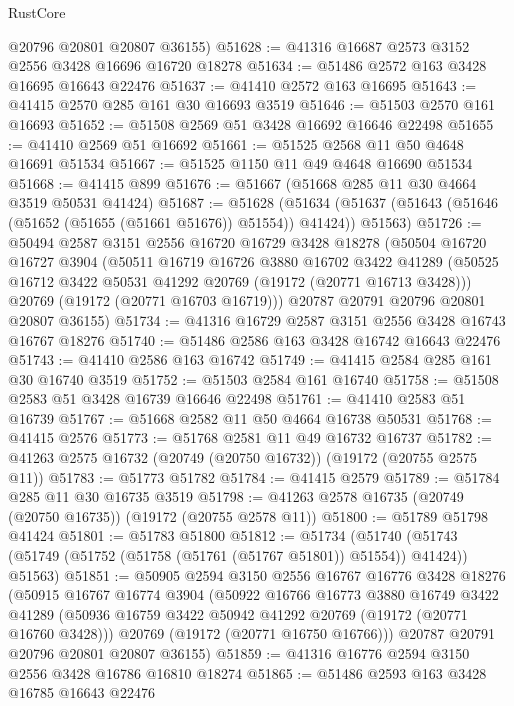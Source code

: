 \begin{lexlean}{RustCore}
\begin{coremodule}
      @20796
      @20801
      @20807
      @36155)
@51628 := @41316 @16687 @2573 @3152 @2556 @3428 @16696 @16720 @18278
@51634 := @51486 @2572 @163 @3428 @16695 @16643 @22476
@51637 := @41410 @2572 @163 @16695
@51643 := @41415 @2570 @285 @161 @30 @16693 @3519
@51646 := @51503 @2570 @161 @16693
@51652 := @51508 @2569 @51 @3428 @16692 @16646 @22498
@51655 := @41410 @2569 @51 @16692
@51661 := @51525 @2568 @11 @50 @4648 @16691 @51534
@51667 := @51525 @1150 @11 @49 @4648 @16690 @51534
@51668 := @41415 @899
@51676 := @51667 (@51668 @285 @11 @30 @4664 @3519 @50531 @41424)
@51687 := @51628
    (@51634 (@51637 (@51643 (@51646 (@51652 (@51655 (@51661 @51676)) @51554)) @41424)) @51563)
@51726 := @50494
    @2587
    @3151
    @2556
    @16720
    @16729
    @3428
    @18278
    (@50504
      @16720
      @16727
      @3904
      (@50511
        @16719
        @16726
        @3880
        @16702
        @3422
        @41289
        (@50525 @16712 @3422 @50531 @41292 @20769 (@19172 (@20771 @16713 @3428)))
        @20769
        (@19172 (@20771 @16703 @16719)))
      @20787
      @20791
      @20796
      @20801
      @20807
      @36155)
@51734 := @41316 @16729 @2587 @3151 @2556 @3428 @16743 @16767 @18276
@51740 := @51486 @2586 @163 @3428 @16742 @16643 @22476
@51743 := @41410 @2586 @163 @16742
@51749 := @41415 @2584 @285 @161 @30 @16740 @3519
@51752 := @51503 @2584 @161 @16740
@51758 := @51508 @2583 @51 @3428 @16739 @16646 @22498
@51761 := @41410 @2583 @51 @16739
@51767 := @51668 @2582 @11 @50 @4664 @16738 @50531
@51768 := @41415 @2576
@51773 := @51768 @2581 @11 @49 @16732 @16737
@51782 := @41263 @2575 @16732 (@20749 (@20750 @16732)) (@19172 (@20755 @2575 @11))
@51783 := @51773 @51782
@51784 := @41415 @2579
@51789 := @51784 @285 @11 @30 @16735 @3519
@51798 := @41263 @2578 @16735 (@20749 (@20750 @16735)) (@19172 (@20755 @2578 @11))
@51800 := @51789 @51798 @41424
@51801 := @51783 @51800
@51812 := @51734
    (@51740 (@51743 (@51749 (@51752 (@51758 (@51761 (@51767 @51801)) @51554)) @41424)) @51563)
@51851 := @50905
    @2594
    @3150
    @2556
    @16767
    @16776
    @3428
    @18276
    (@50915
      @16767
      @16774
      @3904
      (@50922
        @16766
        @16773
        @3880
        @16749
        @3422
        @41289
        (@50936 @16759 @3422 @50942 @41292 @20769 (@19172 (@20771 @16760 @3428)))
        @20769
        (@19172 (@20771 @16750 @16766)))
      @20787
      @20791
      @20796
      @20801
      @20807
      @36155)
@51859 := @41316 @16776 @2594 @3150 @2556 @3428 @16786 @16810 @18274
@51865 := @51486 @2593 @163 @3428 @16785 @16643 @22476

\end{coremodule}
\end{lexlean}
